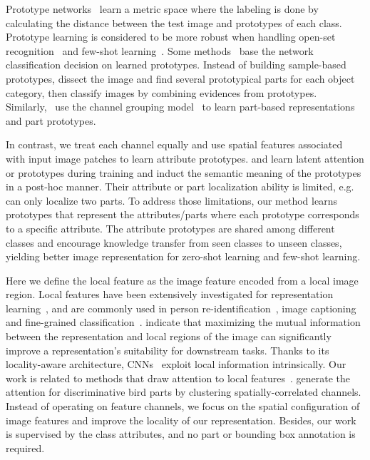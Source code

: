 Prototype networks~\citep{yang2018robust,wang2019panet} learn a metric space where the labeling is done by calculating the distance between the test image and prototypes of each class.
Prototype learning is considered to be more robust when handling open-set recognition~\citep{yang2018robust,shu2019p} 
and few-shot learning~\citep{snell2017prototypical,gao2019hybrid,oreshkin2018tadam}. 
Some methods~\citep{arik2019attention,yeh2018representer,li2018deep} base the network classification decision on learned prototypes.
Instead of building sample-based prototypes, \citet{chen2019looks} dissect the image and find several prototypical parts for each object category, then classify images by combining evidences from prototypes.
Similarly,~\citet{zhu2019learning} use the channel grouping model~\citep{zheng2017learning} to learn part-based representations and part prototypes.

In contrast, we treat each channel equally and use spatial features associated with input image patches to learn attribute prototypes. \citet{chen2019looks} and \citet{SGMA,zhu2019learning} learn latent attention or prototypes during training and induct the semantic meaning of the prototypes in a post-hoc manner. Their attribute or part localization ability is limited, e.g. \citet{SGMA} can only localize two parts. To address those limitations, our method learns prototypes that represent the attributes/parts where each prototype corresponds to a specific attribute. 
The attribute prototypes are shared among different classes and encourage knowledge transfer from seen classes to unseen classes, yielding better image representation for zero-shot learning and few-shot learning.

 Here we define the local feature as the image feature encoded from a local image region. Local features have been extensively investigated for representation learning~\citep{hjelm2018learning,wei2019iterative,noroozi2016unsupervised}, and are commonly used in person re-identification~\citep{sun2018beyond,wang2018learning}, image captioning~\citep{updown,li2017image} and fine-grained classification~\citep{zheng2017learning,fu2017look,zhang2016picking}. 
\citet{hjelm2018learning} indicate that maximizing the mutual information between the representation and local regions of the image can significantly improve a representation’s suitability for downstream tasks. 
Thanks to its locality-aware architecture, CNNs~\citep{he2016deep} exploit local information intrinsically. 
Our work is related to methods that draw attention to local features~\citep{kim2018bilinear,sun2018beyond}.
\citet{zheng2017learning} generate the attention for discriminative bird parts by clustering spatially-correlated channels. Instead of operating on feature channels, we focus on the spatial configuration of image features and improve the locality of our representation. Besides, our work is supervised by the class attributes, and no part or bounding box annotation is required. 


